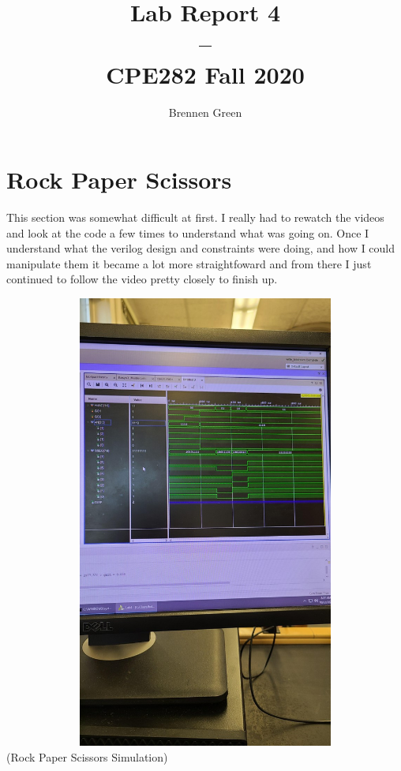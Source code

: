 \documentclass[11pt]{article}
\begin{document}
\date{} 
\title{Lab Report 4\\--\\\large CPE282 Fall 2020}
\author{Brennen Green}
\maketitle

\section*{Rock Paper Scissors}
This section was somewhat difficult at first. I really had to rewatch the videos and look at
the code a few times to understand what was going on. Once I understand what the verilog design
and constraints were doing, and how I could manipulate them it became a lot more straightfoward
and from there I just continued to follow the video pretty closely to finish up.
\begin{center}
\includegraphics[width=15cm,height=15cm]{rps_sim}\newline
(Rock Paper Scissors Simulation)
\end{center}
\end{document}
